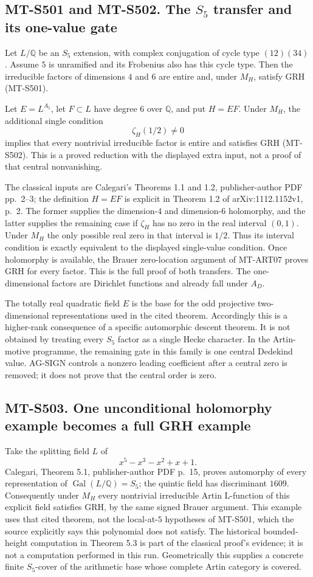 \subsection*{MT-S501 and MT-S502. The $S_5$ transfer and its one-value gate}
Let $L/\mathbb Q$ be an $S_5$ extension, with complex conjugation of cycle
type $(12)(34)$. Assume $5$ is unramified and its Frobenius also has this
cycle type. Then the irreducible factors of dimensions $4$ and $6$ are
entire and, under $M_H$, satisfy GRH (MT-S501).

Let $E=L^{A_5}$, let $F\subset L$ have degree $6$ over $\mathbb Q$, and
put $H=EF$. Under $M_H$, the additional single condition
\[
                         \zeta_H(1/2)\ne0
\]
implies that every nontrivial irreducible factor is entire and satisfies
GRH (MT-S502). This is a proved reduction with the displayed extra input,
not a proof of that central nonvanishing.

The classical inputs are Calegari's Theorems 1.1 and 1.2,
publisher-author PDF pp.~2--3; the definition $H=EF$ is explicit in
Theorem 1.2 of arXiv:1112.1152v1, p.~2. The former supplies the
dimension-$4$ and dimension-$6$ holomorphy, and the latter supplies the
remaining case if $\zeta_H$ has no zero in the real interval $(0,1)$.
Under $M_H$ the only possible real zero in that interval is $1/2$.
Thus its interval condition is exactly equivalent to the displayed
single-value condition. Once holomorphy is available, the Brauer
zero-location argument of MT-ART07 proves GRH for every factor.
This is the full proof of both transfers. The one-dimensional factors
are Dirichlet functions and already fall under $A_D$.

The totally real quadratic field $E$ is the base for the odd projective
two-dimensional representations used in the cited theorem. Accordingly
this is a higher-rank consequence of a specific automorphic descent
theorem. It is not obtained by treating every $S_5$ factor as a single
Hecke character. In the Artin-motive programme, the remaining gate in
this family is one central Dedekind value. AG-SIGN controls a nonzero
leading coefficient after a central zero is removed; it does not prove
that the central order is zero.

\subsection*{MT-S503. One unconditional holomorphy example becomes a full GRH example}
Take the splitting field $L$ of
\[
                        x^5-x^3-x^2+x+1.
\]
Calegari, Theorem 5.1, publisher-author PDF p.~15, proves automorphy of
every representation of $\operatorname{Gal}(L/\mathbb Q)=S_5$;
the quintic field has discriminant $1609$. Consequently under $M_H$
every nontrivial irreducible Artin L-function of this explicit field
satisfies GRH, by the same signed Brauer argument. This example uses
that cited theorem, not the local-at-$5$ hypotheses of MT-S501, which
the source explicitly says this polynomial does not satisfy.
The historical bounded-height computation in Theorem 5.3 is part of
the classical proof's evidence; it is not a computation performed in
this run. Geometrically this supplies a concrete finite \(S_5\)-cover
of the arithmetic base whose complete Artin category is covered.

